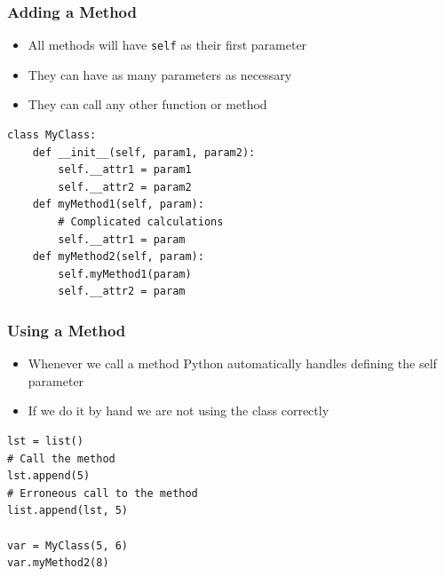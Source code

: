 \documentclass[11pt]{beamer}
\begin{document}
\begin{frame}[fragile]\frametitle{Adding a Method}
\begin{itemize}
\item All methods will have \lstinline|self| as their first parameter
\item They can have as many parameters as necessary
\item They can call any other function or method
\end{itemize}
\begin{lstlisting}
class MyClass:
    def __init__(self, param1, param2):
        self.__attr1 = param1
        self.__attr2 = param2
    def myMethod1(self, param):
        # Complicated calculations
        self.__attr1 = param
    def myMethod2(self, param):
        self.myMethod1(param)
        self.__attr2 = param
\end{lstlisting}\textbf{}
\end{frame}

\begin{frame}[fragile]\frametitle{Using a Method}
\begin{itemize}
\item Whenever we call a method Python automatically handles defining the self parameter
\item If we do it by hand we are not using the class correctly
\end{itemize}
\begin{lstlisting}
lst = list()
# Call the method
lst.append(5)
# Erroneous call to the method
list.append(lst, 5)

var = MyClass(5, 6)
var.myMethod2(8)
\end{lstlisting}
\end{frame}
\end{document}
